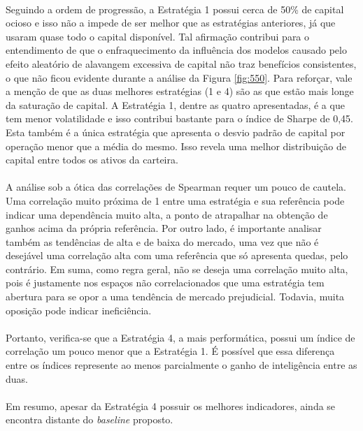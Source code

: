 \paragraph{} Seguindo a ordem de progressão, a Estratégia 1 possui cerca de 50\% de capital ocioso e isso não a impede de ser melhor que as estratégias anteriores, já que usaram quase todo o capital disponível. Tal afirmação contribui para o entendimento de que o enfraquecimento da influência dos modelos causado pelo efeito aleatório de alavangem excessiva de capital não traz benefícios consistentes, o que não ficou evidente durante a análise da Figura \ref{fig:550}. Para reforçar, vale a menção de que as duas melhores estratégias (1 e 4) são as que estão mais longe da saturação de capital. A Estratégia 1, dentre as quatro apresentadas, é a que tem menor volatilidade e isso contribui bastante para o índice de Sharpe de 0,45. Esta também é a única estratégia que apresenta o desvio padrão de capital por operação menor que a média do mesmo. Isso revela uma melhor distribuição de capital entre todos os ativos da carteira.

\paragraph{} A análise sob a ótica das correlações de Spearman requer um pouco de cautela. Uma correlação muito próxima de 1 entre uma estratégia e sua referência pode indicar uma dependência muito alta, a ponto de atrapalhar na obtenção de ganhos acima da própria referência. Por outro lado, é importante analisar também as tendências de alta e de baixa do mercado, uma vez que não é desejável uma correlação alta com uma referência que só apresenta quedas, pelo contrário. Em suma, como regra geral, não se deseja uma correlação muito alta, pois é justamente nos espaços não correlacionados que uma estratégia tem abertura para se opor a uma tendência de mercado prejudicial. Todavia, muita oposição pode indicar ineficiência.

\paragraph{} Portanto, verifica-se que a Estratégia 4, a mais performática, possui um índice de correlação um pouco menor que a Estratégia 1. É possível que essa diferença entre os índices represente ao menos parcialmente o ganho de inteligência entre as duas.

\paragraph{} Em resumo, apesar da Estratégia 4 possuir os melhores indicadores, ainda se encontra distante do \textit{baseline} proposto.
